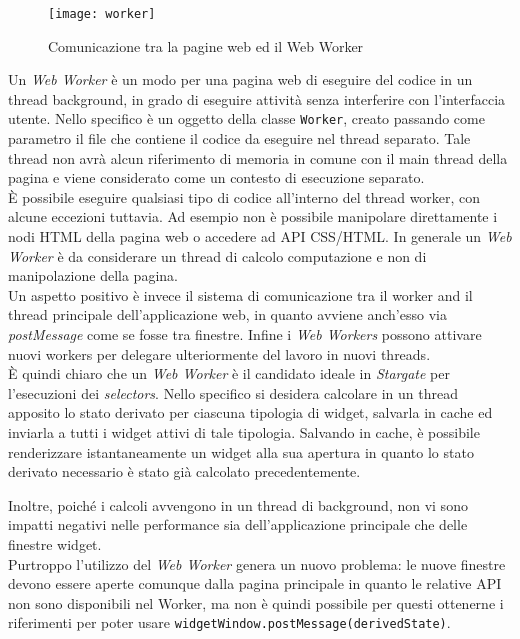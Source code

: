 \begin{figure}[H] 
  \centering 
  \texttt{[image: worker]} 
  \caption{Comunicazione tra la pagine web ed il Web Worker}
\end{figure}

Un \textit{Web Worker} è un modo per una pagina web di eseguire del codice in un thread background, in grado di eseguire attività senza interferire con l'interfaccia utente. Nello specifico è un oggetto della classe \texttt{Worker}, creato passando come parametro il file che contiene il codice da eseguire nel thread separato. Tale thread non avrà alcun riferimento di memoria in comune con il main thread della pagina e viene considerato come un contesto di esecuzione separato. \\

È possibile eseguire qualsiasi tipo di codice all'interno del thread worker, con alcune eccezioni tuttavia. Ad esempio non è possibile manipolare direttamente i nodi HTML della pagina web o accedere ad API CSS/HTML. In generale un \textit{Web Worker} è da considerare un thread di calcolo computazione e non di manipolazione della pagina. \\

Un aspetto positivo è invece il sistema di comunicazione tra il worker and il thread principale dell'applicazione web, in quanto avviene anch'esso via \textit{postMessage} come se fosse tra finestre. Infine i \textit{Web Workers} possono attivare nuovi workers per delegare ulteriormente del lavoro in nuovi threads. \\

È quindi chiaro che un \textit{Web Worker} è il candidato ideale in \textit{Stargate} per l'esecuzioni dei \textit{selectors}. Nello specifico si desidera calcolare in un thread apposito lo stato derivato per ciascuna tipologia di widget, salvarla in cache ed inviarla a tutti i widget attivi di tale tipologia. Salvando in cache, è possibile renderizzare istantaneamente un widget alla sua apertura in quanto lo stato derivato necessario è stato già calcolato precedentemente.

Inoltre, poiché i calcoli avvengono in un thread di background, non vi sono impatti negativi nelle performance sia dell'applicazione principale che delle finestre widget. \\

Purtroppo l'utilizzo del \textit{Web Worker} genera un nuovo problema: le nuove finestre devono essere aperte comunque dalla pagina principale in quanto le relative API non sono disponibili nel Worker, ma non è quindi possibile per questi ottenerne i riferimenti per poter usare \texttt{widgetWindow.postMessage(derivedState)}. 

